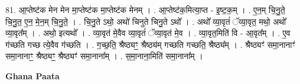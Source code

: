 \documentclass[17pt]{extarticle}
\begin{document}
81. आ॒प्तेष्ट॑क मेन मेन मा॒प्तेष्ट॑क मा॒प्तेष्ट॑क मेनम् । . आ॒प्तेष्ट॑क॒मित्या॒प्त - इ॒ष्ट॒क॒म् । . ए॒न॒म् चि॒नु॒ते॒ चि॒नु॒त॒ ए॒न॒ मे॒न॒म् चि॒नु॒ते॒ । . चि॒नु॒ते ऽथो॒ अथो॑ चिनुते चिनु॒ते ऽथो᳚ । . अथो᳚ व्या॒वृतं॑ ॅव्या॒वृत॒ मथो॒ अथो᳚ व्या॒वृत᳚म् । . अथो॒ इत्यथो᳚ । . व्या॒वृत॑ मे॒वैव व्या॒वृतं॑ ॅव्या॒वृत॑ मे॒व । . व्या॒वृत॒मिति॑ वि - आ॒वृत᳚म् । . ए॒व ग॑च्छति गच्छ त्ये॒वैव ग॑च्छति । . ग॒च्छ॒ति॒ श्रैष्ठ्यꣳ॒॒ श्रैष्ठ्य॑म् गच्छति गच्छति॒ श्रैष्ठ्य᳚म् । . श्रैष्ठ्यꣳ॑ समा॒नानाꣳ॑ समा॒नानाꣳ॒॒ श्रैष्ठ्यꣳ॒॒ श्रैष्ठ्यꣳ॑ समा॒नाना᳚म् । . स॒मा॒नाना॒मिति॑ समा॒नाना᳚म् । \newline

\textbf{Ghana Paata } \newline
\end{document}
